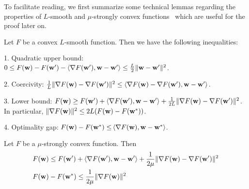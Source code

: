 

To facilitate reading, we first summarize some technical lemmas regarding the properties of $L$-smooth and $\mu$-strongly
convex functions~\cite{rockafellar1970convex} which are useful for the proof later on. 
\begin{lemma}
	Let $F$ be a convex $L$-smooth function. Then we have the following
	inequalities:
	
	1. Quadratic upper bound: $0\leq F({\mathbf{w}})-F({\mathbf{w}}')-\langle\nabla F({\mathbf{w}}'),{\mathbf{w}}-{\mathbf{w}}'\rangle\leq\frac{L}{2}\|{\mathbf{w}}-{\mathbf{w}}'\|^{2}$. 
	
	2. Coercivity: $\frac{1}{L}\|\nabla F({\mathbf{w}})-\nabla F({\mathbf{w}}')\|^{2}\leq\langle\nabla F({\mathbf{w}})-\nabla F({\mathbf{w}}'),{\mathbf{w}}-{\mathbf{w}}'\rangle$.
	
	3. Lower bound: $F({\mathbf{w}})\geq F({\mathbf{w}}')+\langle\nabla F({\mathbf{w}}'),{\mathbf{w}}-{\mathbf{w}}'\rangle+\frac{1}{2L}\|\nabla F({\mathbf{w}})-\nabla F({\mathbf{w}}')\|^{2}$.
	In particular, $\|\nabla F({\mathbf{w}})\|^{2}\leq2L(F({\mathbf{w}})-F({\mathbf{w}}^{\ast}))$.
	
	4. Optimality gap: $F({\mathbf{w}})-F({\mathbf{w}}^{\ast})\leq$$\langle\nabla F({\mathbf{w}}),{\mathbf{w}}-{\mathbf{w}}^{\ast}\rangle$.
\end{lemma}
%
\begin{lemma}
	Let $F$ be a $\mu$-strongly convex function. Then 
	\begin{align*}
	& F({\mathbf{w}})  \leq F({\mathbf{w}}')+\langle\nabla F({\mathbf{w}}'),{\mathbf{w}}-{\mathbf{w}}'\rangle+\frac{1}{2\mu}\|\nabla F({\mathbf{w}})-\nabla F({\mathbf{w}}')\|^{2}\\
	& F({\mathbf{w}})-F({\mathbf{w}}^{\ast})  \leq\frac{1}{2\mu}\|\nabla F({\mathbf{w}})\|^{2}
	\end{align*}
\end{lemma}
